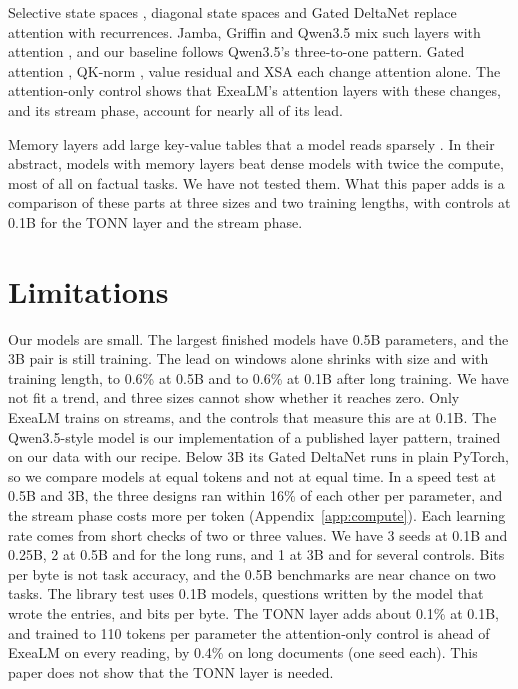 \documentclass[10pt,twocolumn,letterpaper]{article}
\begin{document}
Selective state spaces \citep{gu2023mamba}, diagonal state spaces \citep{gu2022s4d} and Gated DeltaNet \citep{yang2025gated} replace attention with recurrences.
Jamba, Griffin and Qwen3.5 mix such layers with attention \citep{lieber2024jamba,de2024griffin,qwen35}, and our baseline follows Qwen3.5's three-to-one pattern.
Gated attention \citep{qiu2025gated}, QK-norm \citep{henry2020qknorm}, value residual \citep{zhou2024value} and XSA \citep{zhai2026xsa} each change attention alone.
The attention-only control shows that ExeaLM's attention layers with these changes, and its stream phase, account for nearly all of its lead.

Memory layers add large key-value tables that a model reads sparsely \citep{berges2025memory}.
In their abstract, models with memory layers beat dense models with twice the compute, most of all on factual tasks.
We have not tested them.
What this paper adds is a comparison of these parts at three sizes and two training lengths, with controls at 0.1B for the TONN layer and the stream phase.

\section{Limitations}
\label{sec:limits}

Our models are small.
The largest finished models have 0.5B parameters, and the 3B pair is still training.
The lead on windows alone shrinks with size and with training length, to 0.6\% at 0.5B and to 0.6\% at 0.1B after long training.
We have not fit a trend, and three sizes cannot show whether it reaches zero.
Only ExeaLM trains on streams, and the controls that measure this are at 0.1B.
The Qwen3.5-style model is our implementation of a published layer pattern, trained on our data with our recipe.
Below 3B its Gated DeltaNet runs in plain PyTorch, so we compare models at equal tokens and not at equal time.
In a speed test at 0.5B and 3B, the three designs ran within 16\% of each other per parameter, and the stream phase costs more per token (Appendix~\ref{app:compute}).
Each learning rate comes from short checks of two or three values.
We have 3 seeds at 0.1B and 0.25B, 2 at 0.5B and for the long runs, and 1 at 3B and for several controls.
Bits per byte is not task accuracy, and the 0.5B benchmarks are near chance on two tasks.
The library test uses 0.1B models, questions written by the model that wrote the entries, and bits per byte.
The TONN layer adds about 0.1\% at 0.1B, and trained to 110 tokens per parameter the attention-only control is ahead of ExeaLM on every reading, by 0.4\% on long documents (one seed each).
This paper does not show that the TONN layer is needed.
\end{document}

